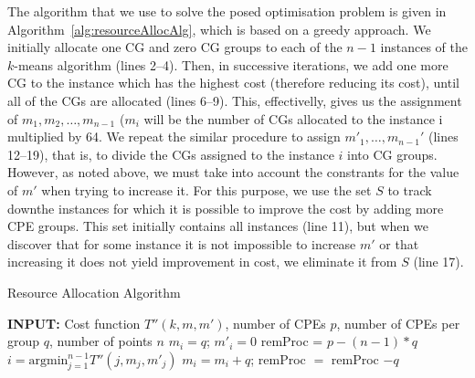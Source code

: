 \documentclass[10pt,journal,compsoc]{IEEEtran}
\begin{document}
The algorithm that we use to solve the posed optimisation problem is
given in Algorithm~\ref{alg:resourceAllocAlg}, which is based on a
greedy approach. We initially allocate one CG and zero CG groups to each of the $n-1$ instances
of the $k$-means algorithm (lines 2--4). Then, in successive
iterations, we add one more CG to the instance which has the highest
cost (therefore reducing its cost), until all of the CGs are
allocated (lines 6--9). This, effectivelly, gives us
the assignment of $m_1,m_2,\dots,m_{n-1}$ ($m_i$ will be the number of
CGs allocated to the instance i multiplied by 64. We repeat the similar
procedure to assign $m'_1,\dots,m_{n-1}'$ (lines 12--19), that is, to
divide the CGs assigned to the instance $i$ into CG groups.
However, as noted above, we must take into account the
constrants for the value of $m'$ when trying to increase it. For this
purpose, we use the set $S$ to track downthe instances for which it
is possible to improve the cost by adding more CPE groups. This set
initially contains all instances (line 11), but when we discover that
for some instance it is not impossible to increase $m'$ or that
increasing it does not yield improvement in cost, we eliminate it from
$S$ (line 17). 

\begin{algorithm}
\caption{Resource Allocation Algorithm}
\label{alg:resourceAllocAlg}
\begin{algorithmic}[1]
  \STATE \textbf{INPUT:} Cost function $T''(k,m,m')$, number of CPEs
  $p$, number of CPEs per group $q$, number of points $n$
  \STATE $m_i = q$; $m'_i= 0$
  \ENDFOR
  \STATE remProc = $p - (n-1) * q$
  \STATE $i = \mbox{argmin}_{j=1}^{n-1} T''(j,m_j,m'_j)$
  \STATE $m_i = m_i + q$; remProc $=$ remProc $-q$
  \ENDWHILE
  \ENDFOR 
\end{algorithmic}
\end{algorithm}
\end{document}
